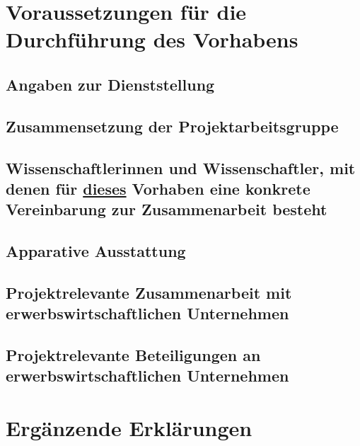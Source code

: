 \documentclass{scrartcl}
\begin{document}
\section{Voraussetzungen für die Durchführung des Vorhabens}

\subsection{Angaben zur Dienststellung}

\subsection{Zusammensetzung der Projektarbeitsgruppe}

\subsection{Wissenschaftlerinnen und Wissenschaftler, mit denen für \underline{dieses} Vorhaben eine konkrete Vereinbarung zur Zusammenarbeit besteht}

\subsection{Apparative Ausstattung}

\subsection{Projektrelevante Zusammenarbeit mit erwerbswirtschaftlichen Unternehmen}

\subsection{Projektrelevante Beteiligungen an erwerbswirtschaftlichen Unternehmen}


\section{Ergänzende Erklärungen}
\end{document}
